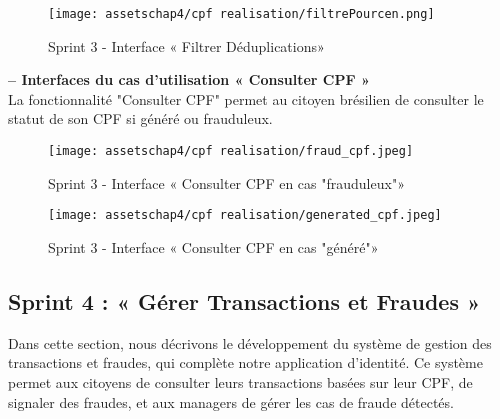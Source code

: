 \begin{figure}[H]
\centering
\texttt{[image: assetschap4/cpf realisation/filtrePourcen.png]}
\caption{ Sprint 3 - Interface « Filtrer Déduplications» }
\label{fig:5.12}
\end{figure}



\textbf{– Interfaces du cas d'utilisation « Consulter CPF »}\\
La fonctionnalité "Consulter CPF" permet au citoyen brésilien de consulter le statut de son CPF si généré ou frauduleux.

\begin{figure}[H]
\centering
\texttt{[image: assetschap4/cpf realisation/fraud\_cpf.jpeg]}
\caption{ Sprint 3 - Interface « Consulter CPF en cas "frauduleux"» }
\label{fig:5.13}
\end{figure}




\begin{figure}[H]
\centering
\texttt{[image: assetschap4/cpf realisation/generated\_cpf.jpeg]}
\caption{ Sprint 3 - Interface « Consulter CPF en cas "généré"» }
\label{fig:5.13}
\end{figure}


































\newpage  %
\subsection{Sprint 4 : « Gérer Transactions et Fraudes »}
Dans cette section, nous décrivons le développement du système de gestion des transactions et fraudes, qui complète notre application d'identité. Ce système permet aux citoyens de consulter leurs transactions basées sur leur CPF, de signaler des fraudes, et aux managers de gérer les cas de fraude détectés.
